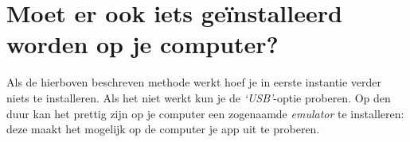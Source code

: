 \section{Moet er ook iets ge\"installeerd worden op je computer?}
Als de hierboven beschreven methode werkt hoef je in eerste instantie verder niets te installeren. Als het niet werkt kun je de \emph{`USB'}-optie proberen. Op den duur kan het prettig zijn op je computer een zogenaamde \emph{emulator} te installeren: deze maakt het mogelijk op de computer je app uit te proberen.  



